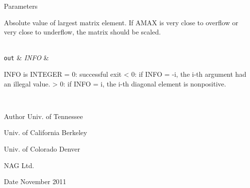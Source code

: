 \begin{DoxyParams}[1]{Parameters}
\begin{DoxyVerb}
          Absolute value of largest matrix element.  If AMAX is very
          close to overflow or very close to underflow, the matrix
          should be scaled.\end{DoxyVerb}
\\
\hline
\mbox{\tt out}  & {\em I\+N\+F\+O} & \begin{DoxyVerb}          INFO is INTEGER
          = 0:  successful exit
          < 0:  if INFO = -i, the i-th argument had an illegal value.
          > 0:  if INFO = i, the i-th diagonal element is nonpositive.\end{DoxyVerb}
 \\
\hline
\end{DoxyParams}
\begin{DoxyAuthor}{Author}
Univ. of Tennessee 

Univ. of California Berkeley 

Univ. of Colorado Denver 

N\+A\+G Ltd. 
\end{DoxyAuthor}
\begin{DoxyDate}{Date}
November 2011 
\end{DoxyDate}
